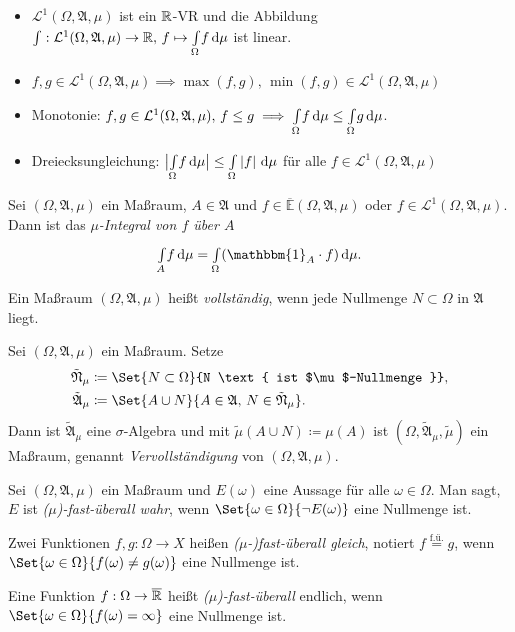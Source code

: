 \documentclass{cheat-sheet}
\newcommand{\ER}{\overline\R} %
\newcommand{\Alg}{\mathfrak{A}} %
\newcommand{\E}{\mathbb{E}} %
\newcommand{\Leb}{\mathcal{L}} %
\newcommand{\ind}{\mathbbm{1}} %
\newcommand{\IntOmu}[1]{\Int{\Omega}{}{#1}{\mu}} %
\begin{document}
\begin{satz}
  \begin{itemize}
    \item $\Leb^1(\Omega, \Alg, \mu)$ ist ein $\mathbb{R}$-VR und die Abbildung ${\textstyle \int} : \Leb^1(\Omega, \Alg, \mu) \to \R, \, f \mapsto \IntOmu{f}$ ist linear.
    \item $f, g \in \Leb^1(\Omega, \Alg, \mu) \implies \max(f, g), \, \min(f, g) \in \Leb^1(\Omega, \Alg, \mu)$
    \item Monotonie: $f, g \in \Leb^1(\Omega, \Alg, \mu), \, f \leq g \implies \IntOmu{f} \leq \IntOmu{g}$.
    \item Dreiecksungleichung: $\big| \IntOmu{f} \big| \leq \IntOmu{\left|f\right|}$ für alle $f \in \Leb^1(\Omega, \Alg, \mu)$
  \end{itemize}
\end{satz}

\begin{defn}
  Sei $(\Omega, \Alg, \mu)$ ein Maßraum, $A \in \Alg$ und $f \in \overline{\E}(\Omega, \Alg, \mu)$ oder $f \in \Leb^1(\Omega, \Alg, \mu)$. Dann ist das \emph{$\mu$-Integral von $f$ über $A$}
  \[ \Int{A}{}{f}{\mu} = \IntOmu{(\ind_A \cdot f)}. \]
\end{defn}

\begin{defn}
  Ein Maßraum $(\Omega, \Alg, \mu)$ heißt \emph{vollständig}, wenn jede Nullmenge $N \subset \Omega$ in $\Alg$ liegt.
\end{defn}

\begin{defn}
  Sei $(\Omega, \Alg, \mu)$ ein Maßraum. Setze
  \begin{align*}
    \tilde{\mathfrak{N}}_\mu &\coloneqq \Set{N \subset \Omega}{N \text{ ist $\mu$-Nullmenge }}, \\
    \tilde{\Alg}_\mu &\coloneqq \Set{ A \cup N }{ A \in \Alg, \, N \in \tilde{\mathfrak{N}}_\mu }.
  \end{align*}
  Dann ist $\tilde{\Alg}_\mu$ eine $\sigma$-Algebra und mit $\tilde{\mu}(A \cup N) \coloneqq \mu(A)$ ist $(\Omega, \tilde{\Alg}_\mu, \tilde{\mu})$ ein Maßraum, genannt \emph{Vervollständigung} von $(\Omega, \Alg, \mu)$.
\end{defn}

\begin{defn}
  Sei $(\Omega, \Alg, \mu)$ ein Maßraum und $E(\omega)$ eine Aussage für alle $\omega \in \Omega$. Man sagt, $E$ ist \emph{($\mu$)-fast-überall wahr}, wenn $\Set{\omega \in \Omega}{\neg E(\omega)}$ eine Nullmenge ist.

  Zwei Funktionen $f, g : \Omega \to X$ heißen \emph{($\mu$-)fast-überall gleich}, notiert $f \overset{\text{f.ü.}}= g$, wenn $\Set{\omega \in \Omega}{f(\omega) \not= g(\omega)}$ eine Nullmenge ist.

  Eine Funktion $f : \Omega \to \ER$ heißt \emph{($\mu$)-fast-überall} endlich, wenn $\Set{\omega \in \Omega}{ f(\omega) = \infty}$ eine Nullmenge ist.
\end{defn}
\end{document}
